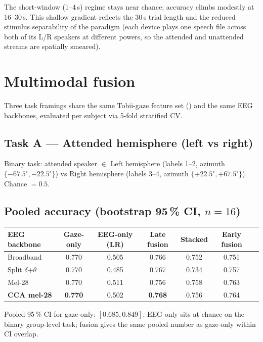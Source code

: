 The short-window (1--4\,s) regime stays near chance; accuracy climbs
modestly at 16--30\,s. This shallow gradient reflects the 30\,s trial length
and the reduced stimulus separability of the paradigm (each device plays
one speech file across both of its L/R speakers at different powers, so
the attended and unattended streams are spatially smeared).

\section{Multimodal fusion}

Three task framings share the same Tobii-gaze feature set
() and the same EEG backbones, evaluated per subject via
5-fold stratified CV.

\subsection{Task A --- Attended hemisphere (left vs right)}

Binary task: attended speaker $\in$ Left hemisphere (labels 1--2, azimuth
$\{-67.5^\circ,-22.5^\circ\}$) vs Right hemisphere (labels 3--4, azimuth
$\{+22.5^\circ,+67.5^\circ\}$). Chance $= 0.5$.

\subsection{Pooled accuracy (bootstrap 95\,\% CI, $n = 16$)}

\begin{table}[ht]
\centering
\begin{tabular}{lcccccc}
\toprule
EEG backbone & Gaze-only & EEG-only (LR) & Late fusion & Stacked & Early fusion \\
\midrule
Broadband          & 0.770 & 0.505 & 0.766 & 0.752 & 0.751 \\
Split $\delta$+$\theta$ & 0.770 & 0.485 & 0.767 & 0.734 & 0.757 \\
Mel-28             & 0.770 & 0.511 & 0.756 & 0.758 & 0.763 \\
\textbf{CCA mel-28} & \textbf{0.770} & 0.502 & \textbf{0.768} & 0.756 & 0.764 \\
\bottomrule
\end{tabular}
\end{table}

Pooled 95\,\% CI for gaze-only: $[0.685, 0.849]$. EEG-only sits at chance on
the binary group-level task; fusion gives the same pooled number as
gaze-only within CI overlap.

